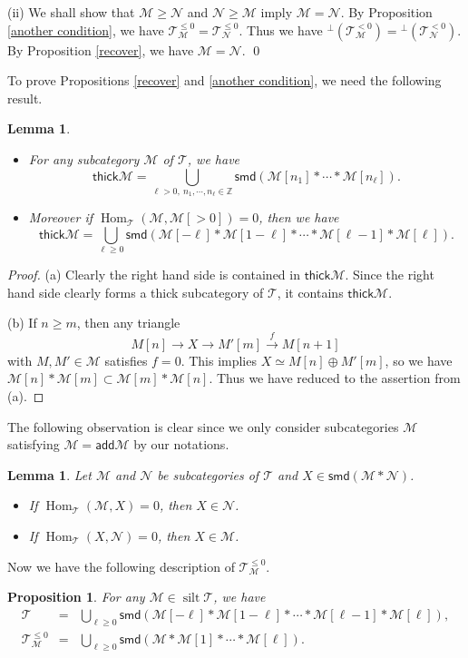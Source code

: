 \documentclass[a4paper,reqno]{amsart}
\newtheorem{lemma}[theorem]{Lemma}
\newtheorem{proposition}[theorem]{Proposition}
\theoremstyle{definition}
\newcommand{\TT}{{\mathcal T}}
\newcommand{\MM}{{\mathcal M}}
\newcommand{\NN}{{\mathcal N}}
\newcommand{\Z}{\mathbb{Z}}
\newcommand{\add}{\mathsf{add}}
\newcommand{\summand}{\mathsf{smd}}
\newcommand{\thick}{\mathsf{thick}}
\newcommand{\Hom}{\operatorname{Hom}\nolimits}
\newcommand{\silt}{\operatorname{silt}\nolimits}
\begin{document}
(ii) We shall show that $\MM\ge\NN$ and $\NN\ge\MM$ imply $\MM=\NN$.
By Proposition \ref{another condition}, we have $\TT_{\MM}^{\le0}=\TT_{\NN}^{\le0}$.
Thus we have ${}^\perp(\TT_{\MM}^{<0})={}^\perp(\TT_{\NN}^{<0})$.
By Proposition \ref{recover}, we have $\MM=\NN$.
\qed

\medskip
To prove Propositions \ref{recover} and \ref{another condition}, we need the following result.

\begin{lemma}\label{generate}
\begin{itemize}
\item[(a)] For any subcategory $\MM$ of $\TT$, we have
\[\thick\MM=\bigcup_{\ell>0,\ n_1,\cdots,n_\ell\in\Z}\summand
(\MM [n_1]*\cdots*\MM [n_{\ell}]).\]
\item[(b)] Moreover if $\Hom_{\TT}(\MM,\MM[>0])=0$, then we have
\[\thick\MM=\bigcup_{\ell\ge0}
\summand(\MM[-\ell]*\MM[1-\ell]*\cdots*\MM[\ell-1]*\MM[\ell]).\]
\end{itemize}
\end{lemma}

\begin{proof}
(a) Clearly the right hand side is contained in $\thick\MM$.
Since the right hand side clearly forms a thick subcategory of $\TT$, it contains $\thick\MM$.

(b) If $n\ge m$, then any triangle
\[M[n]\to X\to M'[m]\xrightarrow{f}M[n+1]\]
with $M,M'\in\MM$ satisfies $f=0$. This implies $X\simeq M[n]\oplus M'[m]$, so we have
$\MM[n]*\MM[m]\subset\MM[m]*\MM[n]$.
Thus we have reduced to the assertion from (a).
\end{proof}

The following observation is clear since we only consider subcategories $\MM$ satisfying $\MM=\add\MM$ by our notations.

\begin{lemma}\label{reduction}
Let $\MM$ and $\NN$ be subcategories of $\TT$ and $X\in\summand(\MM*\NN)$.
\begin{itemize}
\item[(a)] If $\Hom_{\TT}(\MM,X)=0$, then $X\in\NN$.
\item[(b)] If $\Hom_{\TT}(X,\NN)=0$, then $X\in\MM$.
\end{itemize}
\end{lemma}

Now we have the following description of $\TT_{\MM}^{\le0}$.

\begin{proposition}\label{generate2}
For any $\MM\in\silt\TT$, we have
\begin{eqnarray*}
\TT&=&\bigcup_{\ell\ge0}\summand(\MM[-\ell]*\MM[1-\ell]*\cdots*\MM[\ell-1]*\MM[\ell]),\\
\TT_{\MM}^{\le0}&=&\bigcup_{\ell\ge0}\summand(\MM*\MM[1]*\cdots*\MM[\ell]).
\end{eqnarray*}
\end{proposition}
\end{document}
